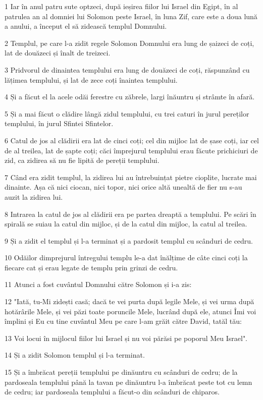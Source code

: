 \par 1 Iar în anul patru sute optzeci, după ieșirea fiilor lui Israel din Egipt, în al patrulea an al domniei lui Solomon peste Israel, în luna Zif, care este a doua lună a anului, a început el să zidească templul Domnului.
\par 2 Templul, pe care l-a zidit regele Solomon Domnului era lung de șaizeci de coți, lat de douăzeci și înalt de treizeci.
\par 3 Pridvorul de dinaintea templului era lung de douăzeci de coți, răspunzând cu lățimea templului, și lat de zece coți înaintea templului.
\par 4 Și a făcut el la acele odăi ferestre cu zăbrele, largi înăuntru și strâmte în afară.
\par 5 Și a mai făcut o clădire lângă zidul templului, cu trei caturi în jurul pereților templului, în jurul Sfintei Sfintelor.
\par 6 Catul de jos al clădirii era lat de cinci coți; cel din mijloc lat de șase coți, iar cel de al treilea, lat de șapte coți; căci împrejurul templului erau făcute prichiciuri de zid, ca zidirea să nu fie lipită de pereții templului.
\par 7 Când era zidit templul, la zidirea lui au întrebuințat pietre cioplite, lucrate mai dinainte. Așa că nici ciocan, nici topor, nici orice altă unealtă de fier nu s-au auzit la zidirea lui.
\par 8 Intrarea la catul de jos al clădirii era pe partea dreaptă a templului. Pe scări în spirală se suiau la catul din mijloc, și de la catul din mijloc, la catul al treilea.
\par 9 Și a zidit el templul și l-a terminat și a pardosit templul cu scânduri de cedru.
\par 10 Odăilor dimprejurul întregului templu le-a dat înălțime de câte cinci coți la fiecare cat și erau legate de templu prin grinzi de cedru.
\par 11 Atunci a fost cuvântul Domnului către Solomon și i-a zis:
\par 12 "Iată, tu-Mi zidești casă; dacă te vei purta după legile Mele, și vei urma după hotărârile Mele, și vei păzi toate poruncile Mele, lucrând după ele, atunci Îmi voi împlini și Eu cu tine cuvântul Meu pe care l-am grăit către David, tatăl tău:
\par 13 Voi locui în mijlocul fiilor lui Israel și nu voi părăsi pe poporul Meu Israel".
\par 14 Și a zidit Solomon templul și l-a terminat.
\par 15 Și a îmbrăcat pereții templului pe dinăuntru cu scânduri de cedru; de la pardoseala templului până la tavan pe dinăuntru l-a îmbrăcat peste tot cu lemn de cedru; iar pardoseala templului a făcut-o din scânduri de chiparos.
